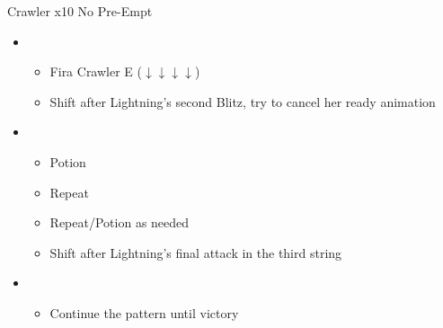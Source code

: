 	\begin{battle}[0:21]{Crawler x10 No Pre-Empt}
		\begin{itemize}
			\item \first
			      \begin{itemize}
				      \item Fira Crawler E ($\downarrow \downarrow \downarrow \downarrow$)
				      \item Shift after Lightning's second Blitz, try to cancel her ready animation
			      \end{itemize}
			\item \sixth
			      \begin{itemize}
				      \item Potion
				      \item Repeat
				      \item Repeat/Potion as needed
				      \item Shift after Lightning's final attack in the third string
			      \end{itemize}
			\item \first
			      \begin{itemize}
				      \item Continue the pattern until victory
			      \end{itemize}
		\end{itemize}
	\end{battle}
	\renewcommand{\first}{[1] Slash \& Burn (\com/\rav)}
	\renewcommand{\second}{[2] War \& Peace (\com/\med)}
	\renewcommand{\third}{[3] Supersoldier (\com/\syn)}
	\renewcommand{\fourth}{[4] Dualcasting (\rav/\rav)}
	\renewcommand{\fifth}{[5] Dualcasting (\rav/\rav)}
	\renewcommand{\sixth}{[6] Slash \& Burn (\com/\rav)}
